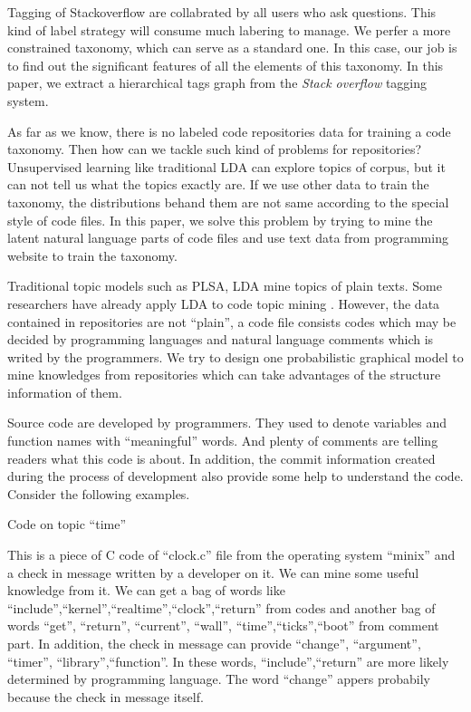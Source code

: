 Tagging of Stackoverflow are collabrated by all users who ask questions. 
This kind of label strategy will consume much labering to manage. We perfer 
a more constrained taxonomy, which can serve as a standard one. In this case, 
our job is to find out the significant features of all the elements of this 
taxonomy. In this paper, we extract a hierarchical tags graph from the 
{\it Stack overflow} tagging system.

As far as we know, there is no labeled code repositories data for training
a code taxonomy. Then how can we tackle such kind of problems for repositories?
Unsupervised learning like traditional LDA can explore topics of corpus, but 
it can not tell us what the topics exactly are. If we use other data to train
the taxonomy, the distributions behand them are not same according to the 
special style of code files. In this paper, we solve this problem by trying
to mine the latent natural language parts of code files and use text data from
programming website to train the taxonomy.

Traditional topic models such as PLSA\cite{hofmann1999probabilistic}, LDA
\cite{blei2003latent} mine topics of plain texts. Some researchers have 
already apply LDA to code topic mining \cite{linstead2007mining,tian2009using}.
However, the data contained in repositories are not ``plain'', a 
code file consists codes which may be decided by programming
languages and natural language comments which is writed by the programmers.
We try to design one probabilistic graphical model to mine knowledges from 
repositories which can take advantages of the structure information of them. 

Source code are developed by programmers. They used to 
denote variables and function names with ``meaningful'' words. And plenty of comments 
are telling readers what this code is about. In addition, the commit information created
during the process of development also provide some help to understand the code.
Consider the following examples.
\begin{example}
\label{ex-bear1}
Code on topic ``time''
\end{example}
This is a piece of C code of ``clock.c'' file from the operating system ``minix'' and a check 
in message written by a developer on it. We can mine some useful knowledge from it. We can 
get a bag of words like ``include'',``kernel'',``realtime'',``clock'',``return'' from codes 
and another bag of words ``get'', ``return'', ``current'', ``wall'', ``time'',``ticks'',``boot'' 
from comment part. In addition, the check in message can provide ``change'', ``argument'', 
``timer'', ``library'',``function''. In these words, ``include'',``return'' are more likely 
determined by programming language. The word ``change'' appers probabily because the check 
in message itself.


